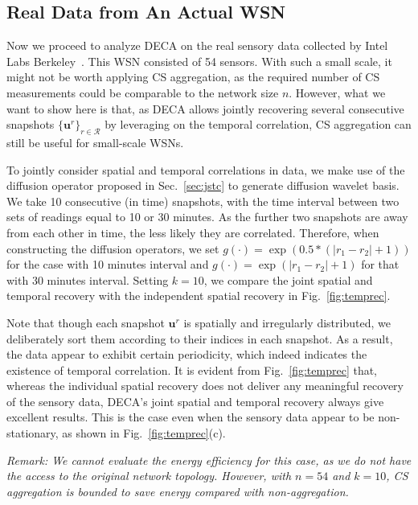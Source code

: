 \documentclass[conference]{IEEEtran}
\begin{document}
  \subsection{Real Data from An Actual WSN} \label{sec:intel}
Now we proceed to analyze DECA on the real sensory data collected by Intel Labs Berkeley~\cite{Intel}. This WSN consisted of 54 sensors. With such a small scale,  it might not be worth applying CS aggregation, as the required number of CS measurements could be comparable to the network size $n$. However, what we want to show here is that, as DECA allows jointly recovering several consecutive snapshots $\{\mathbf{u}^r\}_{r\in\mathcal{R}}$ by leveraging on the temporal correlation, CS aggregation can still be useful for small-scale WSNs.


    To jointly consider spatial and temporal correlations in data, we make use of the diffusion operator proposed in Sec.~\ref{sec:jstc} to generate diffusion wavelet basis. We take 10 consecutive (in time) snapshots, with the time interval between two sets of readings equal to 10 or 30 minutes. As the further two snapshots are away from each other in time, the less likely they are correlated. Therefore, when constructing the diffusion operators, we set $g(\cdot) = \exp(0.5*(|r_1-r_2|+1))$ for the case with 10 minutes interval and $g(\cdot) = \exp(|r_1-r_2|+1)$ for that with 30 minutes interval. Setting $k=10$, we compare the joint spatial and temporal recovery with the independent spatial recovery in Fig.~\ref{fig:temprec}.


    Note that though each snapshot $\mathbf{u}^r$ is spatially and irregularly distributed, we deliberately sort them according to their indices in each snapshot. As a result, the data appear to exhibit certain periodicity, which indeed indicates the existence of temporal correlation. It is evident from Fig.~\ref{fig:temprec} that, whereas the individual spatial recovery does not deliver any meaningful recovery of the sensory data, DECA's joint spatial and temporal recovery always give excellent results. This is the case even when the sensory data appear to be non-stationary, as shown in Fig.~\ref{fig:temprec}(c).

    \vspace{1ex}\noindent\emph{Remark: We cannot evaluate the energy efficiency for this case, as we do not have the access to the original network topology. However, with $n=54$ and $k=10$, CS aggregation is bounded to save energy compared with non-aggregation.}
\end{document}
